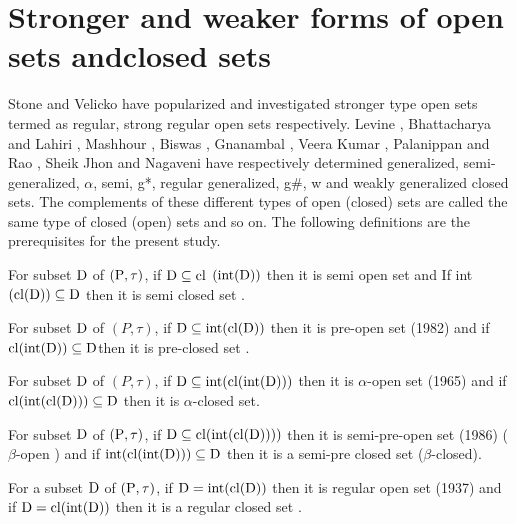\section{Stronger and weaker forms of open sets and\break closed sets}

Stone \cite{Stone} and Velicko \cite{Velicko} have popularized and investigated stronger type open sets termed as regular, strong regular open sets respectively. Levine \cite{Levine}, Bhattacharya and Lahiri \cite{Bhattacharya}, Mashhour \cite{abd}, Biswas \cite{Biswas}, Gnanambal \cite{Gnanambal}, Veera Kumar \cite{Veerakumar}, Palanippan and Rao \cite{Palaniappan}, Sheik Jhon \cite{Sheik} and Nagaveni \cite{Nagaveni} have respectively determined generalized, semi-generalized, $\alpha$, semi, g*, regular generalized, g\#, w and weakly generalized closed sets. The complements of these different types of open (closed) sets are called the same type of closed (open) sets and so on. The following definitions are the prerequisites for the present study.

\begin{dfn}\label{dfn1.2.1}
For subset $\mathrm{D}$ of $(\mathrm{P}, \tau)$, if $\mathrm{D} \subseteq \mathrm{cl}$ $(\mbox{int} (\mathrm{D}))$ then it is semi open set and If int $(\mathrm{cl}(\mathrm{D})) \subseteq \mathrm{D}$ then it is semi closed set \cite{Levine1}.
\end{dfn}

\begin{dfn}\label{dfn1.2.2}
For subset $\mathrm{D}$ of $(P, \tau)$, if $\mathrm{D} \subseteq \mbox{int}(\mathrm{cl}(\mathrm{D}))$ then it is pre-open set (1982) and if $\mathrm{cl}(\mbox{int}(\mathrm{D})) \subseteq \mathrm{D}$then it is pre-closed set \cite{Arya1}. 
\end{dfn}

\begin{dfn}\label{dfn1.2.3}
For subset $\mathrm{D}$ of $(P, \tau)$, if $\mathrm{D} \subseteq\mbox{int} (\mathrm{cl}(\mbox{int}(\mathrm{D})))$ then it is $\alpha$-open set \cite{Njastad} (1965) and if $\mathrm{cl}(\mbox{int}(\mathrm{cl}(\mathrm{D})))\subseteq \mathrm{D}$ then it is $\alpha$-closed set.
\end{dfn}

\begin{dfn}\label{dfn1.2.4}
For subset $\mathrm{D}$ of $(\mathrm{P}, \tau)$, if $\mathrm{D} \subseteq \mathrm{cl}(\mbox{int}(\mathrm{cl}(\mathrm{D}))))$ then it is semi-pre-open set (1986) ($\beta$-open \cite{abd}) and if $\mbox{int}(\mathrm{cl}(\mbox{int}(\mathrm{D}))) \subseteq \mathrm{D}$ then it is a semi-pre closed set ($\beta$-closed). 
\end{dfn}

\begin{dfn}\label{dfn1.2.5}
For a subset $\mathrm{D}$ of $(\mathrm{P}, \tau)$, if $\mathrm{D} = \mbox{int} (\mathrm{cl}(\mathrm{D}))$ then it is regular open set (1937) and if $\mathrm{D} = \mathrm{cl}(\mbox{int}(\mathrm{D}))$ then it is a regular closed set \cite{Long}.
\end{dfn}

